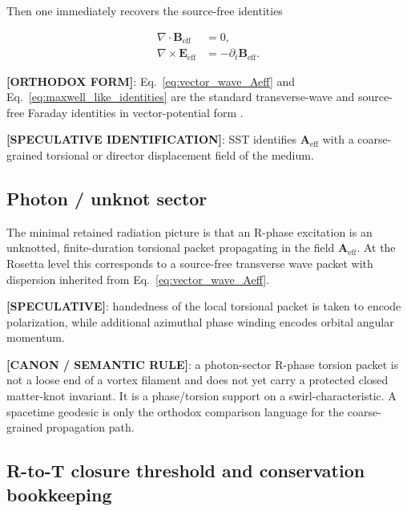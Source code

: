 \documentclass[11pt]{article}
\theoremstyle{definition}
\theoremstyle{plain}
\theoremstyle{remark}
\begin{document}
        Then one immediately recovers the source-free identities

        \begin{align}
            \nabla\cdot \mathbf{B}_{\mathrm{eff}} &= 0, \\
            \nabla\times \mathbf{E}_{\mathrm{eff}} &= -\partial_t \mathbf{B}_{\mathrm{eff}}.
            \label{eq:maxwell_like_identities}
        \end{align}

        \textbf{[ORTHODOX FORM]}: Eq.~\eqref{eq:vector_wave_Aeff} and Eq.~\eqref{eq:maxwell_like_identities} are the standard transverse-wave and source-free Faraday identities in vector-potential form \cite{Jackson1999}.

        \textbf{[SPECULATIVE IDENTIFICATION]}: SST identifies $\mathbf{A}_{\mathrm{eff}}$ with a coarse-grained torsional or director displacement field of the medium.

    \subsection{Photon / unknot sector}

        The minimal retained radiation picture is that an R-phase excitation is an unknotted, finite-duration torsional packet propagating in the field $\mathbf{A}_{\mathrm{eff}}$. At the Rosetta level this corresponds to a source-free transverse wave packet with dispersion inherited from Eq.~\eqref{eq:vector_wave_Aeff}.

        \textbf{[SPECULATIVE]}: handedness of the local torsional packet is taken to encode polarization, while additional azimuthal phase winding encodes orbital angular momentum.

        \textbf{[CANON / SEMANTIC RULE]}:
        a photon-sector R-phase torsion packet is not a loose end of a vortex
        filament and does not yet carry a protected closed matter-knot invariant.
        It is a phase/torsion support on a swirl-characteristic. A spacetime
        geodesic is only the orthodox comparison language for the coarse-grained
        propagation path.

    \subsection{R-to-T closure threshold and conservation bookkeeping}
        \label{subsec:rt_closure_threshold_bookkeeping}
\end{document}
